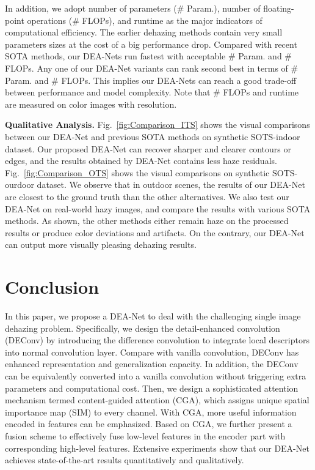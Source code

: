 \documentclass[lettersize,journal]{IEEEtran}
\begin{document}
In addition, we adopt number of parameters (\# Param.), number of floating-point operations (\# FLOPs), and runtime as the major indicators of computational efficiency.
The earlier dehazing methods contain very small parameters sizes at the cost of a big performance drop.
Compared with recent SOTA methods, our DEA-Nets run fastest with acceptable \# Param. and \# FLOPs.
Any one of our DEA-Net variants can rank second best in terms of \# Param. and \# FLOPs.
This implies our DEA-Nets can reach a good trade-off between performance and model complexity.
Note that \# FLOPs and runtime are measured on color images with  resolution.





\textbf{Qualitative Analysis.}
Fig.~\ref{fig:Comparison_ITS} shows the visual comparisons between our DEA-Net and previous SOTA methods on synthetic SOTS-indoor dataset.
Our proposed DEA-Net can recover sharper and clearer contours or edges, and the results obtained by DEA-Net contains less haze residuals.
Fig.~\ref{fig:Comparison_OTS} shows the visual comparisons on synthetic SOTS-ourdoor dataset.
We observe that in outdoor scenes, the results of our DEA-Net are closest to the ground truth than the other alternatives.
We also test our DEA-Net on real-world hazy images, and compare the results with various SOTA methods.
As shown, the other methods either remain haze on the processed results or produce color deviations and artifacts.
On the contrary, our DEA-Net can output more visually pleasing dehazing results.

\section{Conclusion}
\label{sec: conclusion}
In this paper, we propose a DEA-Net to deal with the challenging single image dehazing problem.
Specifically, we design the detail-enhanced convolution (DEConv) by introducing the difference convolution to integrate local descriptors into normal convolution layer.
Compare with vanilla convolution, DEConv has enhanced representation and generalization capacity.
In addition, the DEConv can be equivalently converted into a vanilla convolution without triggering extra parameters and computational cost.
Then, we design a sophisticated attention mechanism termed content-guided attention (CGA), which assigns unique spatial importance map (SIM) to every channel.
With CGA, more useful information encoded in features can be emphasized.
Based on CGA, we further present a fusion scheme to effectively fuse low-level features in the encoder part with corresponding high-level features.
Extensive experiments show that our DEA-Net achieves state-of-the-art results quantitatively and qualitatively.







\end{document}
